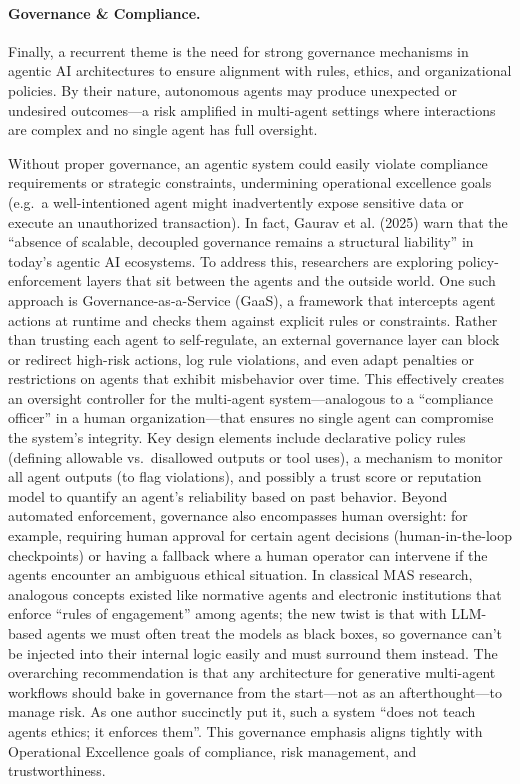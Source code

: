 \paragraph{Governance \& Compliance.} Finally, a recurrent theme is the need for strong governance mechanisms in agentic AI architectures to ensure alignment with rules, ethics, and organizational policies. By their nature, autonomous agents may produce unexpected or undesired outcomes---a risk amplified in multi-agent settings where interactions are complex and no single agent has full oversight.

Without proper governance, an agentic system could easily violate compliance requirements or strategic constraints, undermining operational excellence goals (e.g.~a well-intentioned agent might inadvertently expose sensitive data or execute an unauthorized transaction). In fact, Gaurav et al. (2025) warn that the “absence of scalable, decoupled governance remains a structural liability” in today's agentic AI ecosystems. To address this, researchers are exploring policy-enforcement layers that sit between the agents and the outside world. One such approach is Governance-as-a-Service (GaaS), a framework that intercepts agent actions at runtime and checks them against explicit rules or constraints. Rather than trusting each agent to self-regulate, an external governance layer can block or redirect high-risk actions, log rule violations, and even adapt penalties or restrictions on agents
that exhibit misbehavior over time. This effectively creates an oversight controller for the multi-agent system---analogous to a “compliance officer” in a human organization---that ensures no single agent can compromise the system's integrity. Key design elements include declarative policy rules (defining allowable vs.~disallowed outputs or tool uses), a mechanism to monitor all agent outputs (to flag violations), and possibly a trust score or reputation model to quantify an agent's reliability based on past behavior. Beyond automated enforcement, governance also encompasses human oversight: for example, requiring human approval for certain agent decisions (human-in-the-loop checkpoints) or having a fallback where a human operator can intervene if the agents encounter an ambiguous ethical situation. In classical MAS research, analogous concepts existed like normative agents and electronic institutions that enforce “rules of engagement” among agents; the new twist is that with LLM-based agents we must often treat the models as black boxes, so governance can't be injected into their internal logic easily and must surround them instead. The overarching recommendation is that any architecture for generative multi-agent workflows should bake in governance from the start---not as an afterthought---to manage risk. As one author succinctly put it, such a system “does not teach agents ethics; it enforces them”. This governance emphasis aligns tightly with Operational Excellence goals of compliance, risk management, and trustworthiness. 

